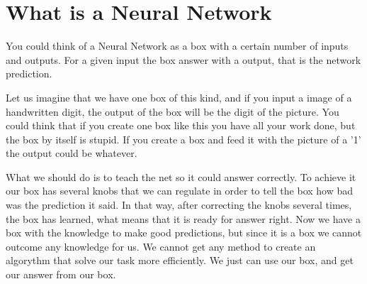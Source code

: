 \section{What is a Neural Network}
You could think of a Neural Network as a box with a certain number of inputs and outputs. For a given input the box answer with a output, that is the network prediction.

Let us imagine that we have one box of this kind, and if you input a image of a handwritten digit, the output of the box will be the digit of the picture. You could think that if you create one box like this you have all your work done, but the box by itself is stupid. If you create a box and feed it with the picture of a '1' the output could be whatever.

What we should do is to teach the net so it could answer correctly. To achieve it our box has several knobs that we can regulate in order to tell the box how bad was the prediction it said. In that way, after correcting the knobs several times, the box has learned, what means that it is ready for answer right. Now we have a box with the knowledge to make good predictions, but since it is a box we cannot outcome any knowledge for us. We cannot get any method to create an algorythm that solve our task more efficiently. We just can use our box, and get our answer from our box.

